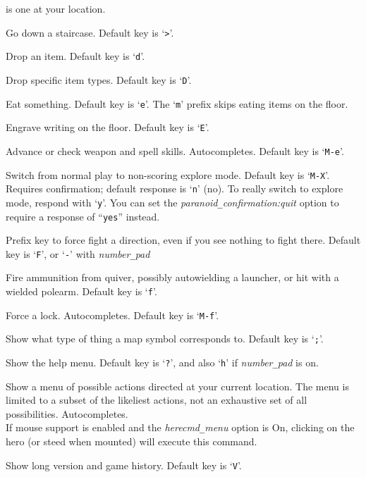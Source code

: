 is one at your location.
\item[\tb{\#down}]
Go down a staircase. Default key is `{\tt >}'.
\item[\tb{\#drop}]
Drop an item. Default key is `{\tt d}'.
\item[\tb{\#droptype}]
Drop specific item types. Default key is `{\tt D}'.
\item[\tb{\#eat}]
Eat something. Default key is `{\tt e}'.
The `{\tt m}' prefix skips eating items on the floor.
\item[\tb{\#engrave}]
Engrave writing on the floor. Default key is `{\tt E}'.
\item[\tb{\#enhance}]
Advance or check weapon and spell skills. Autocompletes.
Default key is `{\tt M-e}'.
\item[\tb{\#exploremode}]
Switch from normal play to non-scoring explore mode.
Default key is `{\tt M-X}'.\\
Requires confirmation; default response is `{\tt n}' (no).
To really switch to explore mode, respond with `{\tt y}'.
You can set the
{\it paranoid\verb+_+confirmation:quit\/}
option to require a response of ``{\tt yes}'' instead.
\item[\tb{\#fight}]
Prefix key to force fight a direction, even if you see nothing
to fight there.
Default key is `{\tt F}', or `{\tt -}' with
{\it number\verb+_+pad\/}
\item[\tb{\#fire}]
Fire ammunition from quiver, possibly autowielding a launcher,
or hit with a wielded polearm.
Default key is `{\tt f}'.
\item[\tb{\#force}]
Force a lock. Autocompletes. Default key is `{\tt M-f}'.
\item[\tb{\#glance}]
Show what type of thing a map symbol corresponds to. Default key is `{\tt ;}'.
\item[\tb{\#help}]
Show the help menu.
Default key is `{\tt ?}',
and also `{\tt h}' if {\it number\verb+_+pad\/} is on.
\item[\tb{\#herecmdmenu}]
Show a menu of possible actions directed at your current location.
The menu is limited to a subset of the likeliest actions, not an
exhaustive set of all possibilities.
Autocompletes.\\
If mouse support is enabled and the {\it herecmd\verb+_+menu\/}
option is On, clicking on the hero (or steed when mounted) will
execute this command.
\item[\tb{\#history}]
Show long version and game history. Default key is `{\tt V}'.
